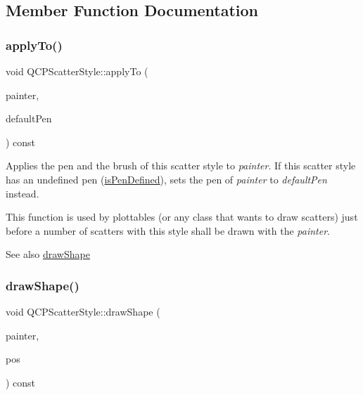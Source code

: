 \subsection{Member Function Documentation}
\mbox{\label{class_q_c_p_scatter_style_afd8044ece445300499ca0dc164821e0f}} 
\subsubsection{\texorpdfstring{apply\+To()}{applyTo()}}
{\footnotesize\ttfamily void Q\+C\+P\+Scatter\+Style\+::apply\+To (\begin{DoxyParamCaption}\item[{\hyperlink{class_q_c_p_painter}{Q\+C\+P\+Painter} $\ast$}]{painter,  }\item[{const Q\+Pen \&}]{default\+Pen }\end{DoxyParamCaption}) const}

Applies the pen and the brush of this scatter style to {\itshape painter}. If this scatter style has an undefined pen (\hyperlink{class_q_c_p_scatter_style_a47077eb6450fe9a788f833e4ec1b1d5a}{is\+Pen\+Defined}), sets the pen of {\itshape painter} to {\itshape default\+Pen} instead.

This function is used by plottables (or any class that wants to draw scatters) just before a number of scatters with this style shall be drawn with the {\itshape painter}.

\begin{DoxySeeAlso}{See also}
\hyperlink{class_q_c_p_scatter_style_a89b5105e6027bfcbfeefed9d201b607c}{draw\+Shape} 
\end{DoxySeeAlso}
\mbox{\label{class_q_c_p_scatter_style_a89b5105e6027bfcbfeefed9d201b607c}} 
\subsubsection{\texorpdfstring{draw\+Shape()}{drawShape()}\hspace{0.1cm}{\footnotesize\ttfamily [1/2]}}
{\footnotesize\ttfamily void Q\+C\+P\+Scatter\+Style\+::draw\+Shape (\begin{DoxyParamCaption}\item[{\hyperlink{class_q_c_p_painter}{Q\+C\+P\+Painter} $\ast$}]{painter,  }\item[{const Q\+PointF \&}]{pos }\end{DoxyParamCaption}) const}

